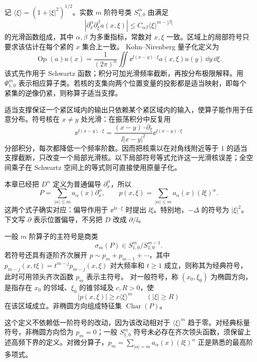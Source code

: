 \begin{definition}[符号与伪微分算子]
记 $\langle\xi\rangle=(1+|\xi|^2)^{1/2}$。实数 $m$ 阶符号类 $S^m_{1,0}$ 由满足
\[
|\partial_x^\alpha\partial_\xi^\beta a(x,\xi)|
\le C_{\alpha\beta}\langle\xi\rangle^{m-|\beta|}
\]
的光滑函数组成，其中 $\alpha,\beta$ 为多重指标，常数对 $x,\xi$ 一致。区域上的局部符号只要求该估计在每个紧的 $x$ 集合上一致。
Kohn--Nirenberg 量子化定义为
\[
\operatorname{Op}(a)u(x)
=\frac1{(2\pi)^n}\iint
\ee^{\ii(x-y)\cdot\xi}a(x,\xi)u(y)\,\dd y\,\dd\xi.
\]
该式先作用于 Schwartz 函数；积分可加光滑频率截断，再按分布极限解释。用 $\Psi^m_{1,0}$ 表示相应算子类。若核的支集向两个位置变量的投影都是适当映射，即每个紧集的逆像仍紧，则称算子适当支撑。
\end{definition}

适当支撑保证一个紧区域内的输出只依赖某个紧区域内的输入，使算子能作用于任意分布。符号核在 $x\ne y$ 处光滑：在振荡积分中反复用
\[
\ee^{\ii(x-y)\cdot\xi}
=\frac{(x-y)\cdot\partial_\xi}{\ii|x-y|^2}
\ee^{\ii(x-y)\cdot\xi}
\]
分部积分，每次都降低一个频率阶数。因而把核乘以在对角线附近等于 $1$ 的适当支撑截断，只改变一个局部光滑核。以下局部符号等式允许这一光滑核误差；全空间乘子在 Schwartz 空间上的等式则可直接使用原量子化。

本章已经把 $D^\alpha$ 定义为普通偏导 $\partial_x^\alpha$，所以
\[
P=\sum_{|\alpha|\le m}a_\alpha(x)\partial_x^\alpha,
\qquad p(x,\xi)=\sum_{|\alpha|\le m}a_\alpha(x)(\ii\xi)^\alpha.
\]
这两个式子确实对应：偏导作用于 $\ee^{\ii x\cdot\xi}$ 时提出 $\ii\xi$。特别地，$-\Delta$ 的符号为 $|\xi|^2$。下文写 $\partial$ 表示位置偏导，不另把 $D$ 改成 $\partial/\ii$。

\begin{definition}[主符号与椭圆方向]
一般 $m$ 阶算子的主符号是商类
\[
\sigma_m(P)\in S^m_{1,0}/S^{m-1}_{1,0}.
\]
若符号还具有逐阶齐次展开 $p\sim p_m+p_{m-1}+\cdots$，其中 $p_{m-j}(x,t\xi)=t^{m-j}p_{m-j}(x,\xi)$ 对大频率和 $t\ge1$ 成立，则称其为经典符号，此时可用领头齐次函数 $p_m$ 表示主符号。
对一般符号，称 $(x_0,\xi_0)$ 为椭圆方向，是指存在 $x_0$ 的邻域、$\xi_0$ 的锥邻域及 $c,R>0$，使
\[
|p(x,\xi)|\ge c\langle\xi\rangle^m\qquad(|\xi|\ge R)
\]
在该区域成立。非椭圆方向组成特征集 $\operatorname{Char}(P)$。
\end{definition}

这个定义不依赖低一阶符号的改动，因为该改动相对于 $\langle\xi\rangle^m$ 趋于零。对经典标量符号，非椭圆方向恰为 $p_m=0$；一般 $S^m_{1,0}$ 符号未必存在齐次领头函数，须保留上述高频下界的定义。对微分算子，$p_m=\sum_{|\alpha|=m}a_\alpha(x)(\ii\xi)^\alpha$ 正是熟悉的最高阶多项式。

